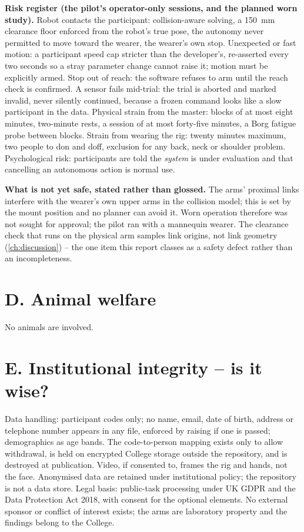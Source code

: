 \textbf{Risk register (the pilot's operator-only sessions, and the planned
worn study).} Robot contacts the participant: collision-aware solving, a
\SI{150}{\milli\metre} clearance floor enforced from the robot's true pose,
the autonomy never permitted to move toward the wearer, the wearer's own
stop. Unexpected or fast motion: a participant speed cap stricter than the
developer's, re-asserted every two seconds so a stray parameter change
cannot raise it; motion must be explicitly armed. Stop out of reach: the
software refuses to arm until the reach check is confirmed. A sensor fails
mid-trial: the trial is aborted and marked invalid, never silently
continued, because a frozen command looks like a slow participant in the
data. Physical strain from the master: blocks of at most eight minutes,
two-minute rests, a session of at most forty-five minutes, a Borg fatigue
probe between blocks. Strain from wearing the rig: twenty minutes maximum,
two people to don and doff, exclusion for any back, neck or shoulder
problem. Psychological risk: participants are told the \emph{system} is
under evaluation and that cancelling an autonomous action is normal use.

\textbf{What is not yet safe, stated rather than glossed.} The arms'
proximal links interfere with the wearer's own upper arms in the collision
model; this is set by the mount position and no planner can avoid it.
Worn operation therefore was not sought for approval; the pilot ran with a
mannequin wearer. The clearance check that runs on the physical arm samples
link origins, not link geometry (\cref{ch:discussion}) -- the one item
this report classes as a safety defect rather than an incompleteness.

\section{D. Animal welfare}

No animals are involved.

\section{E. Institutional integrity -- is it wise?}

Data handling: participant codes only; no name, email, date of birth,
address or telephone number appears in any file, enforced by
 raising if one is passed; demographics as age
bands. The code-to-person mapping exists only to allow withdrawal, is held
on encrypted College storage outside the repository, and is destroyed at
publication. Video, if consented to, frames the rig and hands, not the
face. Anonymised data are retained under institutional policy; the
repository is not a data store. Legal basis: public-task processing under
UK GDPR and the Data Protection Act 2018, with consent for the optional
elements. No external sponsor or conflict of interest exists; the arms are
laboratory property and the findings belong to the College.

